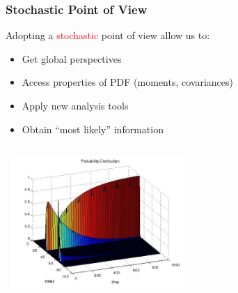 \begin{frame}
 \frametitle{Stochastic Point of View}
Adopting a \textcolor{red}{stochastic} point of view allow us to:
\begin{itemize}
 \item Get global perspectives
 \item Access properties of PDF (moments, covariances)
 \item Apply new analysis tools
 \item Obtain ``most likely'' information
\end{itemize}

\begin{columns}
\hfill
  \includegraphics[trim=0mm 0mm -50mm 0mm, width=70mm,height=50mm]{./figures/MH_probab_plot.jpg}
\hfill
\end{columns}



\end{frame}


